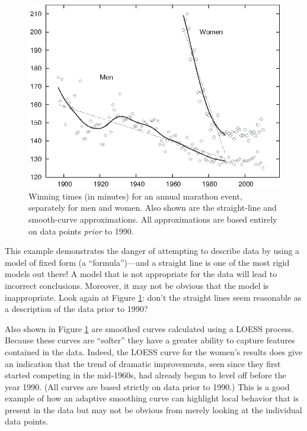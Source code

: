\begin{figure}
    \centerline{\includegraphics{img/marathon}}
  \caption{Winning times (in minutes) for an annual marathon event,
    separately for men and women. Also shown are the straight-line and
    smooth-curve approximations. All approximations are based entirely
    on data points \emph{prior} to 1990.}
  \label{fig:marathon}
\end{figure}

This example demonstrates the danger of attempting to describe data by
using a model of fixed form (a ``formula'')---and a straight line is
one of the most rigid models out there! A model that is not
appropriate for the data will lead to incorrect conclusions.
Moreover, it may not be obvious that the model is inappropriate. Look
again at Figure \ref{fig:marathon}: don't the straight lines seem
reasonable as a description of the data prior to 1990?

Also shown in Figure \ref{fig:marathon} are smoothed curves calculated
using a LOESS process. Because these curves are ``softer'' they have a
greater ability to capture features contained in the data.  Indeed,
the LOESS curve for the women's results does give an indication that
the trend of dramatic improvements, seen since they first started
competing in the mid-1960s, had already begun to level off before the
year 1990. (All curves are based strictly on data prior to 1990.) This
is a good example of how an adaptive smoothing curve can highlight
local behavior that is present in the data but may not be obvious
from merely looking at the individual data points.



